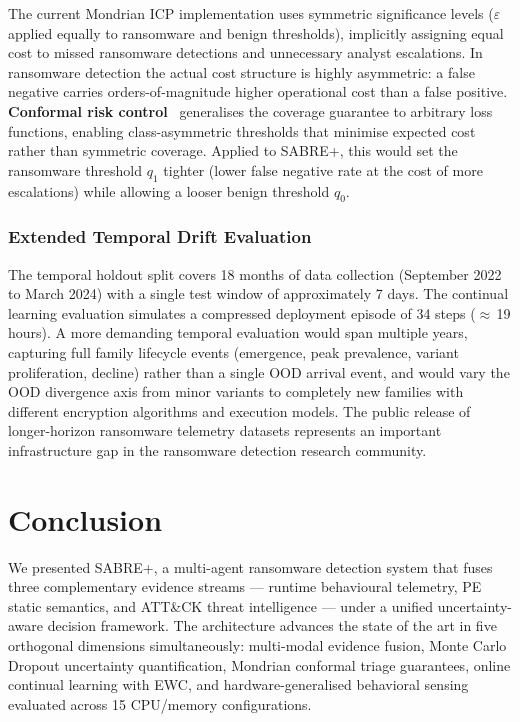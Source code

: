 \documentclass[journal]{IEEEtran}
\begin{document}
The current Mondrian ICP implementation uses symmetric significance levels
($\varepsilon$ applied equally to ransomware and benign thresholds), implicitly assigning
equal cost to missed ransomware detections and unnecessary analyst escalations.
In ransomware detection the actual cost structure is highly asymmetric: a false negative
carries orders-of-magnitude higher operational cost than a false positive.
\textbf{Conformal risk control}~\cite{angelopoulos_conformal_risk_2022} generalises the
coverage guarantee to arbitrary loss functions, enabling class-asymmetric thresholds that
minimise expected cost rather than symmetric coverage.
Applied to SABRE+, this would set the ransomware threshold $q_1$ tighter (lower false
negative rate at the cost of more escalations) while allowing a looser benign threshold
$q_0$.

\subsubsection{Extended Temporal Drift Evaluation}

The temporal holdout split covers 18 months of data collection (September 2022 to
March 2024) with a single test window of approximately 7 days.
The continual learning evaluation simulates a compressed deployment episode of 34 steps
($\approx$\,19 hours).
A more demanding temporal evaluation would span multiple years, capturing full family
lifecycle events (emergence, peak prevalence, variant proliferation, decline) rather than
a single OOD arrival event, and would vary the OOD divergence axis from minor variants to
completely new families with different encryption algorithms and execution models.
The public release of longer-horizon ransomware telemetry datasets represents an important
infrastructure gap in the ransomware detection research community.

\section{Conclusion}
\label{sec:conclusion}

We presented SABRE+, a multi-agent ransomware detection system that fuses three
complementary evidence streams --- runtime behavioural telemetry, PE static semantics,
and ATT\&CK threat intelligence --- under a unified uncertainty-aware decision framework.
The architecture advances the state of the art in five orthogonal dimensions
simultaneously: multi-modal evidence fusion, Monte Carlo Dropout uncertainty
quantification, Mondrian conformal triage guarantees, online continual learning with EWC,
and hardware-generalised behavioral sensing evaluated across 15 CPU/memory configurations.
\end{document}
